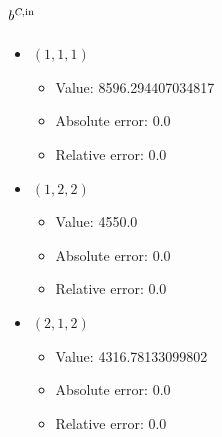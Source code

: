 \documentclass{article}%
\begin{document}
\subsection{$b^{\textsl{C},\text{in}}$}%
\begin{itemize}%
	\item $(1, 1, 1)$%
	\begin{itemize}%
		\item Value: 8596.294407034817%
		\item Absolute error: 0.0%
		\item Relative error: 0.0%
	\end{itemize}%
	\item $(1, 2, 2)$%
	\begin{itemize}%
		\item Value: 4550.0%
		\item Absolute error: 0.0%
		\item Relative error: 0.0%
	\end{itemize}%
	\item $(2, 1, 2)$%
	\begin{itemize}%
		\item Value: 4316.78133099802%
		\item Absolute error: 0.0%
		\item Relative error: 0.0%
	\end{itemize}%
\end{itemize}%
\end{document}
